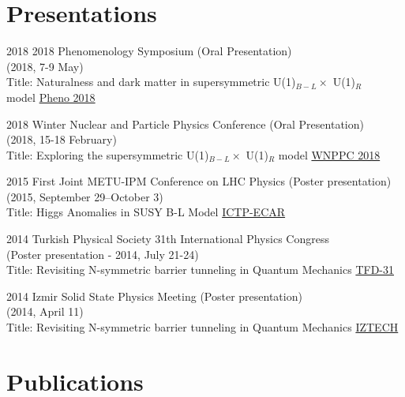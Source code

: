 \documentclass[]{friggeri-cv}
\begin{document}
\section{Presentations}

\begin{entrylist}
	
	\entry
	{2018}
	{2018 Phenomenology Symposium  \normalfont (Oral Presentation) \\ (2018, 7-9 May) \\
		Title: Naturalness and dark matter in supersymmetric U(1)$_{B-L} \times$ U(1)$_R$ \\ model}
	{\href{https://indico.cern.ch/event/699148/}{Pheno 2018}} 
	
	\entry
	{2018}
	{Winter Nuclear and Particle Physics Conference  \normalfont (Oral Presentation) \\ (2018, 15-18 February) \\
	Title: Exploring the supersymmetric U(1)$_{B-L} \times$ U(1)$_R$ model}
	{\href{http://wnppc.triumf.ca/2018/}{WNPPC 2018}}
	
	\entry
	{2015}
	{First Joint METU-IPM Conference on LHC Physics  \normalfont (Poster presentation) \\ (2015, September 29--October 3) \\
	Title: Higgs Anomalies in SUSY B-L Model}
	{\href{http://ictp-ecar.org/events/first-joint-metu-ipm-conference-on-lhc-physics/}{ICTP-ECAR}}
	
	\entry
	{2014}
	{Turkish Physical Society 31th International Physics Congress \\ \normalfont (Poster presentation - 2014, July 21-24) \\
	Title: Revisiting N-symmetric barrier tunneling in Quantum Mechanics}
	{\href{http://www.tfd.com.tr/arsiv/TFD/31/en/default.htm}{TFD-31}}

	\entry
	{2014}
	{Izmir Solid State Physics Meeting  \normalfont (Poster presentation) \\ (2014, April 11) \\
		Title: Revisiting N-symmetric barrier tunneling in Quantum Mechanics}
	{\href{http://ymf.iyte.edu.tr/?page_id=234}{IZTECH}}
	

\end{entrylist}


\newpage

\section{Publications}
\end{document}
